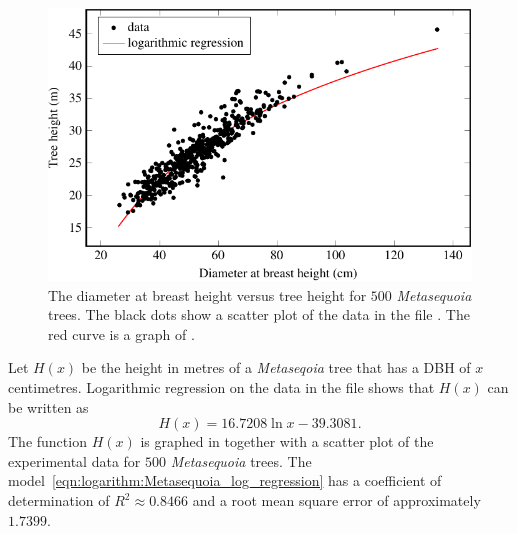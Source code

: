 \documentclass[a4paper,oneside,12pt]{article}
\begin{document}
\begin{problem}
{\begin{solution}
\begin{figure}[!htbp]
\centering
\includegraphics[scale=1.1]{image/12/metasequoia.pdf}
\caption{%
  The diameter at breast height versus tree height for $500$
  \emph{Metasequoia} trees.  The black dots show a scatter plot of the
  data in the file .  The red curve is a graph
  of .
}
\label{fig:logarithm:Metasequoia}
\end{figure}

Let $H(x)$ be the height in metres of a \emph{Metaseqoia} tree that
has a DBH of $x$ centimetres.  Logarithmic regression on the data in
the file  shows that $H(x)$ can be written as
\begin{equation}
\label{eqn:logarithm:Metasequoia_log_regression}
H(x)
=
16.7208 \ln x - 39.3081.
\end{equation}
The function $H(x)$ is graphed in 
together with a scatter plot of the experimental data for $500$
\emph{Metasequoia} trees.  The
model~\eqref{eqn:logarithm:Metasequoia_log_regression} has a
coefficient of determination of $R^2 \approx 0.8466$ and a root mean
square error of approximately $1.7399$.
\end{solution}
}{}

\begin{table}[!htbp]
\centering

\caption{%
  The growth of sunflowers, an experiment in~1919 by H.~S.~Reed and
  R.~H.~Holland.  The ``Day'' column lists how many days since the
  start of the experiment.  The ``Mean height'' column lists the
  average height of $58$ sunflowers as measured on the corresponding
  day, where height is measured in centimetres.
}
\label{tab:logarithm:sunflower}
\end{table}


\end{problem}
\end{document}

